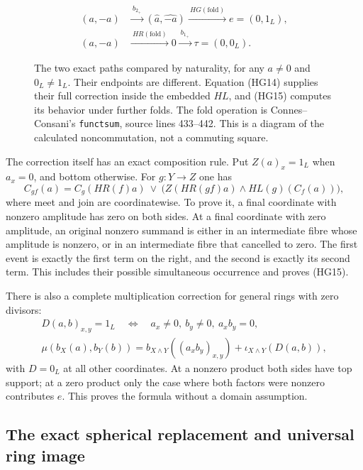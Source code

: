 \begin{figure}[ht]
\centering
\[
\begin{aligned}
 (a,-a)&\xrightarrow{\ b_{2_+}\ }
      (\widehat a,\widehat{-a})
      \xrightarrow{\ HG(\mathrm{fold})\ }e=(0,1_L),\\[4pt]
 (a,-a)&\xrightarrow{\ HR(\mathrm{fold})\ }0
      \xrightarrow{\ b_{1_+}\ }\tau=(0,0_L).
\end{aligned}
\]
\caption{The two exact paths compared by naturality, for any
$a\ne0$ and $0_L\ne1_L$.  Their endpoints are different.
Equation (HG14) supplies their full correction inside the
embedded $HL$, and (HG15) computes its behavior under further
folds.  The fold operation is Connes--Consani's
\texttt{functsum}, source lines 433--442.  This is a diagram
of the calculated noncommutation, not a commuting square.}
\end{figure}

The correction itself has an exact composition rule.  Put
$Z(a)_x=1_L$ when $a_x=0$, and bottom otherwise.  For
$g:Y\to Z$ one has
\begin{equation}\tag{HG15}
 C_{gf}(a)=C_g(HR(f)a)\ \vee\
 \bigl(Z(HR(gf)a)\wedge HL(g)(C_f(a))\bigr),
\end{equation}
where meet and join are coordinatewise.  To prove it, a final
coordinate with nonzero amplitude has zero on both sides.  At
a final coordinate with zero amplitude, an original nonzero
summand is either in an intermediate fibre whose amplitude is
nonzero, or in an intermediate fibre that cancelled to zero.
The first event is exactly the first term on the right, and
the second is exactly its second term.  This includes their
possible simultaneous occurrence and proves (HG15).

There is also a complete multiplication correction for general
rings with zero divisors:
\begin{equation}\tag{HG16}
 \begin{gathered}
 D(a,b)_{x,y}=1_L\quad\Longleftrightarrow\quad
 a_x\ne0,\ b_y\ne0,\ a_xb_y=0,\\
 \mu(b_X(a),b_Y(b))=
 b_{X\wedge Y}((a_xb_y)_{x,y})+\iota_{X\wedge Y}(D(a,b)),
 \end{gathered}
\end{equation}
with $D=0_L$ at all other coordinates.  At a nonzero product
both sides have top support; at a zero product only the case
where both factors were nonzero contributes $e$.  This proves
the formula without a domain assumption.

\subsection{The exact spherical replacement and universal ring image}

